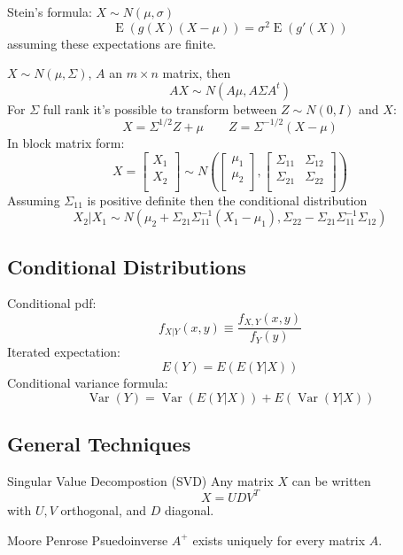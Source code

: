 \documentclass[10pt, twocolumn]{article}
\newcommand{\Expect}{\operatorname{E}}
\newcommand{\Var}{\operatorname{Var}}
\begin{document}
Stein's formula: $X \sim N(\mu, \sigma)$
\[
    \Expect (g(X) (X - \mu)) = \sigma^2 \Expect(g'(X))
\]
assuming these expectations are finite.

$X \sim N(\mu, \Sigma)$, $A$ an $m \times n$ matrix,
then 
\[
    AX \sim N(A \mu, A \Sigma A^t)
\]
For $\Sigma$ full rank it's possible to transform between $Z \sim
N(0, I)$ and $X$:
\[
    X = \Sigma^{1/2} Z + \mu \qquad Z = \Sigma^{-1/2} (X - \mu)
\]
In block matrix form:
\[
    X =
    \begin{bmatrix}
        X_1 \\
        X_2 \\
    \end{bmatrix}
    \sim N \left(
    \begin{bmatrix}
        \mu_1 \\
        \mu_2 \\
    \end{bmatrix}
    ,
    \begin{bmatrix}
        \Sigma_{11} & \Sigma_{12} \\
        \Sigma_{21} & \Sigma_{22} \\
    \end{bmatrix}
\right)
\]
Assuming $\Sigma_{11}$ is positive definite then the conditional
distribution
\[
    X_2 | X_1 \sim N(\mu_2 + \Sigma_{21} \Sigma_{11}^{-1} (X_1 - \mu_1),
    \Sigma_{22} - \Sigma_{21} \Sigma_{11}^{-1} \Sigma_{12})
\]

\subsection*{Conditional Distributions}

Conditional pdf:
\[
    f_{X|Y}(x, y) \equiv \frac{f_{X, Y}(x, y)}{f_Y(y)}
\]
Iterated expectation:
\[
    E(Y) = E(E(Y | X))
\]
Conditional variance formula:
\[
    \Var(Y) = \Var(E(Y | X)) + E(\Var(Y | X))
\]

\newpage

\subsection*{General Techniques}

Singular Value Decompostion (SVD) Any matrix $X$ can be written
\[
    X = UDV^T
\]
with $U, V$ orthogonal, and $D$ diagonal.

Moore Penrose Psuedoinverse $A^+$ exists uniquely for every matrix $A$.
\end{document}

